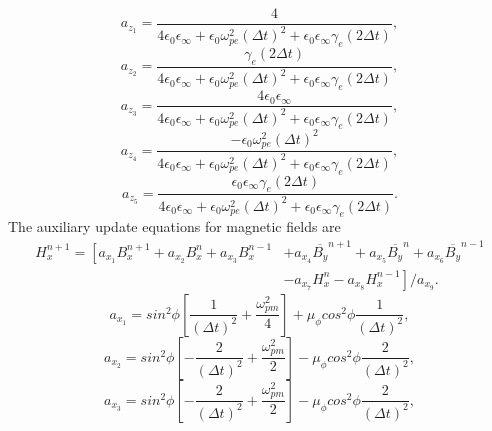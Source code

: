 \begin{equation*}
a_{z_1}=\dfrac{4}{4\epsilon_0\epsilon_\infty+\epsilon_0\omega^2_{pe}\left(\Delta t\right)^2+\epsilon_0\epsilon_\infty \gamma_e \left(2\Delta t\right)},
\end{equation*}
\begin{equation*}
a_{z_2}=\dfrac{\gamma_e\left(2\Delta t\right)}{4\epsilon_0\epsilon_\infty+\epsilon_0\omega^2_{pe}\left(\Delta t\right)^2+\epsilon_0\epsilon_\infty \gamma_e \left(2\Delta t\right)},
\end{equation*}
\begin{equation*}
a_{z_3}=\dfrac{4\epsilon_0\epsilon_\infty}{4\epsilon_0\epsilon_\infty+\epsilon_0\omega^2_{pe}\left(\Delta t\right)^2+\epsilon_0\epsilon_\infty \gamma_e \left(2\Delta t\right)},
\end{equation*}
\begin{equation*}
a_{z_4}=\dfrac{-\epsilon_0\omega^2_{pe}\left(\Delta t\right)^2}{4\epsilon_0\epsilon_\infty+\epsilon_0\omega^2_{pe}\left(\Delta t\right)^2+\epsilon_0\epsilon_\infty \gamma_e \left(2\Delta t\right)},
\end{equation*}
\begin{equation*}
a_{z_5}=\dfrac{\epsilon_0\epsilon_\infty \gamma_e\left(2\Delta t\right)}{4\epsilon_0\epsilon_\infty+\epsilon_0\omega^2_{pe}\left(\Delta t\right)^2+\epsilon_0\epsilon_\infty \gamma_e \left(2\Delta t\right)}.
\end{equation*}
The auxiliary update equations for magnetic fields are
\begin{equation}
\begin{split}
H_x^{n+1}=\left[a_{x_1}B_x^{n+1}+a_{x_2}B_x^{n}+a_{x_3}B_x^{n-1}\right.&\left.+a_{x_4}\overline{B_y}^{n+1}+a_{x_5}\overline{B_y}^{n}+a_{x_6}\overline{B_y}^{n-1}\right.\\
&\left.-a_{x_7}H_x^{n}-a_{x_8}H_x^{n-1}\right]/a_{x_9}.
\end{split}
\label{eq:Hx-Cloak}
\end{equation}
\begin{equation*}
a_{x_1}=sin^2\phi\left[\dfrac{1}{(\Delta t)^2}+\dfrac{\omega_{pm}^2}{4}\right]+\mu_{\phi} cos^2\phi\dfrac{1}{(\Delta t)^2},
\end{equation*}
\begin{equation*}
a_{x_2}=sin^2\phi\left[-\dfrac{2}{(\Delta t)^2}+\dfrac{\omega_{pm}^2}{2}\right]-\mu_{\phi} cos^2\phi\dfrac{2}{(\Delta t)^2},
\end{equation*}
\begin{equation*}
a_{x_3}=sin^2\phi\left[-\dfrac{2}{(\Delta t)^2}+\dfrac{\omega_{pm}^2}{2}\right]-\mu_{\phi} cos^2\phi\dfrac{2}{(\Delta t)^2},
\end{equation*}
